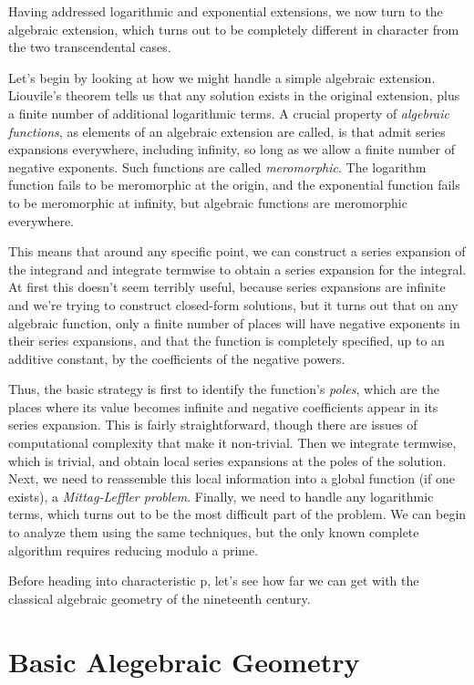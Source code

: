 

Having addressed logarithmic and exponential extensions, we now turn
to the algebraic extension, which turns out to be completely different
in character from the two transcendental cases.

Let's begin by looking at how we might handle a simple algebraic
extension.  Liouvile's theorem tells us that any solution exists in
the original extension, plus a finite number of additional logarithmic
terms.  A crucial property of {\it algebraic functions}, as elements
of an algebraic extension are called, is that admit series expansions
everywhere, including infinity, so long as we allow a finite number of
negative exponents.  Such functions are called {\it meromorphic}.  The
logarithm function fails to be meromorphic at the origin, and the
exponential function fails to be meromorphic at infinity, but
algebraic functions are meromorphic everywhere.

This means that around any specific point, we can construct a series
expansion of the integrand and integrate termwise to obtain a series
expansion for the integral.  At first this doesn't seem terribly
useful, because series expansions are infinite and we're trying to
construct closed-form solutions, but it turns out that on any
algebraic function, only a finite number of places will have negative
exponents in their series expansions, and that the function is
completely specified, up to an additive constant, by the coefficients
of the negative powers.

Thus, the basic strategy is first to identify the function's {\it
poles}, which are the places where its value becomes infinite and
negative coefficients appear in its series expansion.  This is fairly
straightforward, though there are issues of computational complexity
that make it non-trivial.  Then we integrate termwise, which is
trivial, and obtain local series expansions at the poles of the
solution.  Next, we need to reassemble this local information into a
global function (if one exists), a {\it Mittag-Leffler problem}.
Finally, we need to handle any logarithmic terms, which turns out to
be the most difficult part of the problem.  We can begin to analyze
them using the same techniques, but the only known complete algorithm
requires reducing modulo a prime.

Before heading into {characteristic p}, let's see how far we can get
with the classical algebraic geometry of the nineteenth century.

\section{Basic Alegebraic Geometry}

